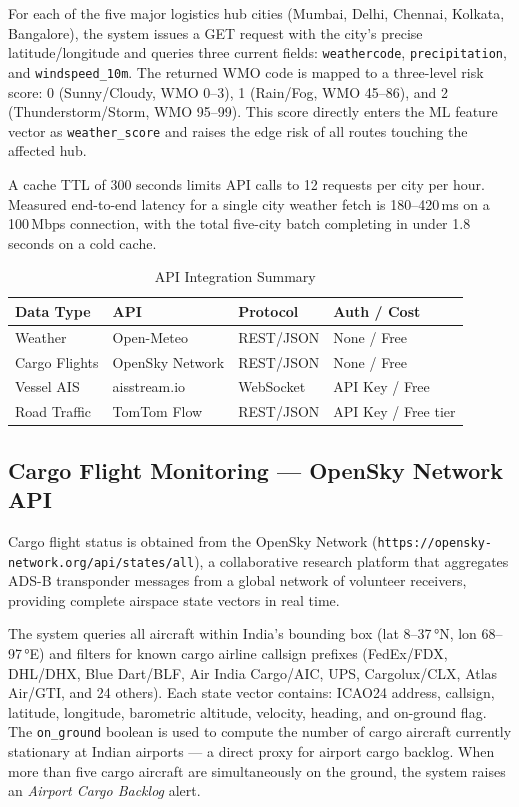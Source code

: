\documentclass[conference]{IEEEtran}
\begin{document}
For each of the five major logistics hub cities
(Mumbai, Delhi, Chennai, Kolkata, Bangalore), the system issues
a GET request with the city's precise latitude/longitude and
queries three current fields:
\texttt{weathercode}, \texttt{precipitation}, and
\texttt{windspeed\_10m}. The returned WMO code is mapped to a
three-level risk score: 0 (Sunny/Cloudy, WMO 0–3), 1 (Rain/Fog,
WMO 45–86), and 2 (Thunderstorm/Storm, WMO 95–99). This score
directly enters the ML feature vector as \texttt{weather\_score}
and raises the edge risk of all routes touching the affected hub.

A cache TTL of 300 seconds limits API calls to 12 requests
per city per hour. Measured end-to-end latency for a single
city weather fetch is 180–420\,ms on a 100\,Mbps connection,
with the total five-city batch completing in under 1.8\,seconds
on a cold cache.

\begin{table}[h!]
\centering
\caption{API Integration Summary}
\label{tab:apis}
\begin{tabularx}{\columnwidth}{p{1.6cm}p{1.5cm}p{1.4cm}p{1.9cm}}
\toprule
\textbf{Data Type} & \textbf{API} & \textbf{Protocol} & \textbf{Auth / Cost} \\
\midrule
Weather & Open-Meteo & REST/JSON & None / Free \\
Cargo Flights & OpenSky Network & REST/JSON & None / Free \\
Vessel AIS & aisstream.io & WebSocket & API Key / Free \\
Road Traffic & TomTom Flow & REST/JSON & API Key / Free tier \\
\bottomrule
\end{tabularx}
\end{table}

\subsection{Cargo Flight Monitoring — OpenSky Network API}

Cargo flight status is obtained from the OpenSky Network
(\texttt{https://opensky-network.org/api/states/all}), a
collaborative research platform that aggregates ADS-B transponder
messages from a global network of volunteer receivers, providing
complete airspace state vectors in real time.

The system queries all aircraft within India's bounding box
(lat 8–37\,°N, lon 68–97\,°E) and filters for known cargo
airline callsign prefixes (FedEx/FDX, DHL/DHX, Blue Dart/BLF,
Air India Cargo/AIC, UPS, Cargolux/CLX, Atlas Air/GTI, and
24 others). Each state vector contains: ICAO24 address, callsign,
latitude, longitude, barometric altitude, velocity, heading,
and on-ground flag. The \texttt{on\_ground} boolean is used to
compute the number of cargo aircraft currently stationary at
Indian airports — a direct proxy for airport cargo backlog.
When more than five cargo aircraft are simultaneously on the
ground, the system raises an \textit{Airport Cargo Backlog} alert.
\end{document}
